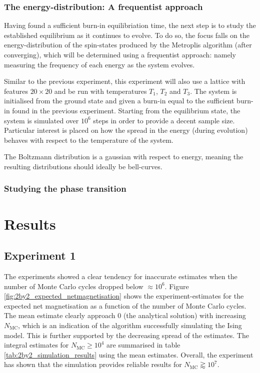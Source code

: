 \documentclass[nofootinbib,reprint,english]{revtex4-1}
\begin{document}
\subsubsection{The energy-distribution: A frequentist approach}
Having found a sufficient burn-in equilibriation time, the next step is to study the established equilibrium as it continues to evolve. To do so, the focus falls on the energy-distribution of the spin-states produced by the Metroplis algorithm (after converging), which will be determined using a frequentist approach: namely measuring the frequency of each energy as the system evolves.

Similar to the previous experiment, this experiment will also use a lattice with features \(20\times20\) and be run with temperatures \(T_1\), \(T_2\) and \(T_3\). The system is initialised from the ground state and given a burn-in equal to the sufficient burn-in found in the previous experiment. Starting from the equilibrium state, the system is simulated over \(10^6\) steps in order to provide a decent sample size. Particular interest is placed on how the spread in the energy (during evolution) behaves with respect to the temperature of the system.

The Boltzmann distribution is a gaussian with respect to energy, meaning the resulting distributions should ideally be bell-curves.
\subsubsection{Studying the phase transition}















\section{Results}
\subsection{Experiment 1}
The experiments showed a clear tendency for inaccurate estimates when the number of Monte Carlo cycles dropped below \(\approx10^6\). Figure \ref{fig:2by2_expected_netmagnetisation} shows the experiment-estimates for the expected net magnetisation as a function of the number of Monte Carlo cycles. The mean estimate clearly approach 0 (the analytical solution) with increasing \(N_\text{MC}\), which is an indication of the algorithm successfully simulating the Ising model. This is further supported by the decreasing spread of the estimates. The integral estimates for \(N_\text{MC}\geq10^4\) are summarised in table \ref{tab:2by2_simulation_results} using the mean estimates. Overall, the experiment has shown that the simulation provides reliable results for \(N_\text{MC}\gtrapprox10^7\).
\end{document}
